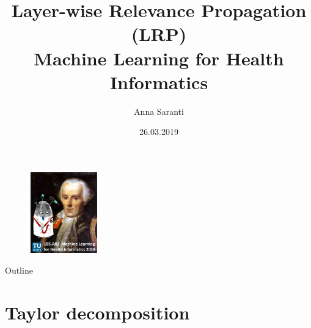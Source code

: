 \documentclass{beamer}
\title[Layer-wise Relevance Propagation (LRP) algorithm]{Layer-wise Relevance Propagation (LRP)\\Machine Learning for Health Informatics}
\author{Anna Saranti}
\institute{Holzinger Group hci-kdd.org}
\date{26.03.2019}
\begin{document}
\begin{frame}
  \titlepage
  
  \begin{figure}[ht]
	\centering
    \includegraphics[width=3cm, height=3.5cm]{figures/HddKciLogo}
	\label{fig:HddKciLogo}
  \end{figure}
  
\end{frame}

\begin{frame}{Outline}
  \tableofcontents
\end{frame}

\section{Taylor decomposition}
\end{document}
